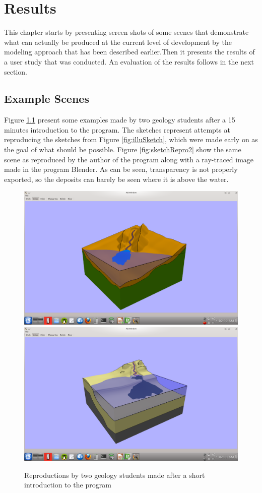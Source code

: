 \documentclass[a4paper,12pt]{report}
\begin{document}
\clearpage
\chapter{Results}
This chapter starts by presenting screen shots of some scenes that demonstrate what can actually be produced at the current level of development by the modeling approach that has been described earlier.Then it presents the results of a user study that was conducted. An evaluation of the results follows in the next section. 
\label{sec:results}

\section{Example Scenes}
Figure \ref{fig:sketchRepro} present some examples made by two geology students after a 15 minutes introduction to the program. The sketches represent attempts at reproducing the sketches from Figure \ref{fig:illuSketch}, which were made early on as the goal of what should be possible. Figure \ref{fig:sketchRepro2} show the same scene as reproduced by the author of the program along with a ray-traced image made in the program Blender. As can be seen, transparency is not properly exported, so the deposits can barely be seen where it is above the water.

\begin{figure}
\includegraphics[trim = 90mm 22mm 80mm 30mm, clip,width=.5\linewidth]{thesis/resultsSection/sketch/user.png}
\includegraphics[trim = 90mm 22mm 80mm 30mm, clip,width=.5\linewidth]{thesis/resultsSection/sketch/user2.png}
 \caption{Reproductions by two geology students made after a short introduction to the program}
 \label{fig:sketchRepro}
\end{figure}
\end{document}
